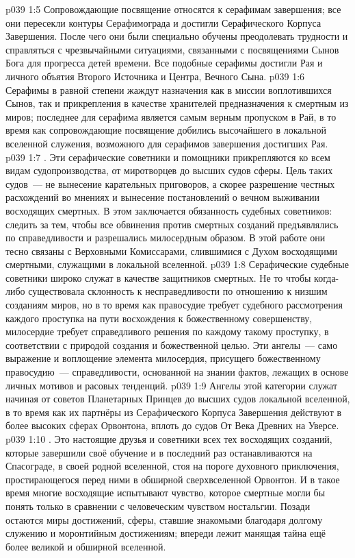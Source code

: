 \vs p039 1:5 Сопровождающие посвящение относятся к серафимам завершения; все они пересекли контуры Серафимограда и достигли Серафического Корпуса Завершения. После чего они были специально обучены преодолевать трудности и справляться с чрезвычайными ситуациями, связанными с посвящениями Сынов Бога для прогресса детей времени. Все подобные серафимы достигли Рая и личного объятия Второго Источника и Центра, Вечного Сына.
\vs p039 1:6 Серафимы в равной степени жаждут назначения как в миссии воплотившихся Сынов, так и прикрепления в качестве хранителей предназначения к смертным из миров; последнее для серафима является самым верным пропуском в Рай, в то время как сопровождающие посвящение добились высочайшего в локальной вселенной служения, возможного для серафимов завершения достигших Рая.
\vs p039 1:7 . Эти серафические советники и помощники прикрепляются ко всем видам судопроизводства, от миротворцев до высших судов сферы. Цель таких судов~--- не вынесение карательных приговоров, а скорее разрешение честных расхождений во мнениях и вынесение постановлений о вечном выживании восходящих смертных. В этом заключается обязанность судебных советников: следить за тем, чтобы все обвинения против смертных созданий предъявлялись по справедливости и разрешались милосердным образом. В этой работе они тесно связаны с Верховными Комиссарами, слившимися с Духом восходящими смертными, служащими в локальной вселенной.
\vs p039 1:8 Серафические судебные советники широко служат в качестве защитников смертных. Не то чтобы когда\hyp{}либо существовала склонность к несправедливости по отношению к низшим созданиям миров, но в то время как правосудие требует судебного рассмотрения каждого проступка на пути восхождения к божественному совершенству, милосердие требует справедливого решения по каждому такому проступку, в соответствии с природой создания и божественной целью. Эти ангелы~--- само выражение и воплощение элемента милосердия, присущего божественному правосудию~--- справедливости, основанной на знании фактов, лежащих в основе личных мотивов и расовых тенденций.
\vs p039 1:9 Ангелы этой категории служат начиная от советов Планетарных Принцев до высших судов локальной вселенной, в то время как их партнёры из Серафического Корпуса Завершения действуют в более высоких сферах Орвонтона, вплоть до судов От Века Древних на Уверсе.
\vs p039 1:10 . Это настоящие друзья и советники всех тех восходящих созданий, которые завершили своё обучение и в последний раз останавливаются на Спасограде, в своей родной вселенной, стоя на пороге духовного приключения, простирающегося перед ними в обширной сверхвселенной Орвонтон. И в такое время многие восходящие испытывают чувство, которое смертные могли бы понять только в сравнении с человеческим чувством ностальгии. Позади остаются миры достижений, сферы, ставшие знакомыми благодаря долгому служению и моронтийным достижениям; впереди лежит манящая тайна ещё более великой и обширной вселенной.
